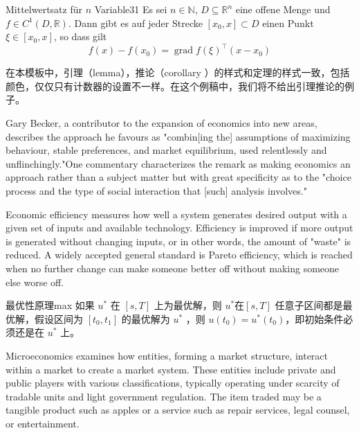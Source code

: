\documentclass[titlestyle=hang,11pt]{elegantbook}
\begin{document}
\begin{theorem}{Mittelwertsatz f\"{u}r $n$ Variable}{31}
Es sei $n\in\mathbb{N}$, $D\subseteq\mathbb{R}^n$ eine offene Menge und $f\in C^{1}(D,\mathbb{R})$. Dann gibt es auf jeder Strecke $[x_0,x]\subset D$ einen Punkt $\xi\in[x_0,x]$, so dass gilt
\begin{equation*}
   f(x)-f(x_0) = \operatorname{grad} f(\xi)^{\top}(x-x_0)
\end{equation*}
\end{theorem}

\begin{note}
在本模板中，引理（lemma），推论（corollary ）的样式和定理的样式一致，包括颜色，仅仅只有计数器的设置不一样。在这个例稿中，我们将不给出引理推论的例子。
\end{note}


Gary Becker, a contributor to the expansion of economics into new areas, describes the approach he favours as "combin[ing the] assumptions of maximizing behaviour, stable preferences, and market equilibrium, used relentlessly and unflinchingly."One commentary characterizes the remark as making economics an approach rather than a subject matter but with great specificity as to the "choice process and the type of social interaction that [such] analysis involves." 


Economic efficiency measures how well a system generates desired output with a given set of inputs and available technology. Efficiency is improved if more output is generated without changing inputs, or in other words, the amount of "waste" is reduced. A widely accepted general standard is Pareto efficiency, which is reached when no further change can make someone better off without making someone else worse off.

\begin{proposition}{最优性原理}{max}
如果 $u^*$ 在 $[s,T]$ 上为最优解，则 $u^*$在$[s,T]$ 任意子区间都是最优解，假设区间为 $[t_0,t_1]$ 的最优解为 $u^*$ ，则 $u(t_0)=u^{*}(t_0)$，即初始条件必须还是在 $u^*$ 上。
\end{proposition}

Microeconomics examines how entities, forming a market structure, interact within a market to create a market system. These entities include private and public players with various classifications, typically operating under scarcity of tradable units and light government regulation. The item traded may be a tangible product such as apples or a service such as repair services, legal counsel, or entertainment.
\end{document}
